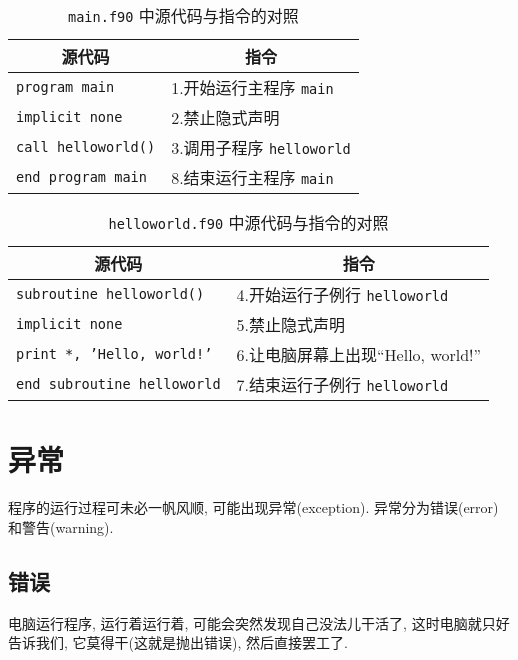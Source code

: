 \begin{table}[!htbp]
    \centering
    \begin{tabular}{|p{}|p{}|}
        \hline
        \multicolumn{1}{|c|}{源代码}&\multicolumn{1}{|c|}{指令}\\
        \hline
        \texttt{program main}&1.开始运行主程序 \texttt{main}\\
        \hline
        \texttt{implicit none}&2.禁止隐式声明\\
        \hline
        \texttt{call helloworld()}&3.调用子程序 \texttt{helloworld}\\
        \hline
        \texttt{end program main}&8.结束运行主程序 \texttt{main}\\
        \hline
    \end{tabular}
    \caption{\texttt{main.f90} 中源代码与指令的对照}
\end{table}
\begin{table}[!htbp]
    \centering
    \begin{tabular}{|p{}|p{}|}
        \hline
        \multicolumn{1}{|c|}{源代码}&\multicolumn{1}{|c|}{指令}\\
        \hline
        \texttt{subroutine helloworld()}&4.开始运行子例行 \texttt{helloworld}\\
        \hline
        \texttt{implicit none}&5.禁止隐式声明\\
        \hline
        \texttt{print *, 'Hello, world!'}&6.让电脑屏幕上出现``Hello, world!''\\
        \hline
        \texttt{end subroutine helloworld}&7.结束运行子例行 \texttt{helloworld}\\
        \hline
    \end{tabular}
    \caption{\texttt{helloworld.f90} 中源代码与指令的对照}
\end{table}

\section{异常}\label{fortran_exception}

程序的运行过程可未必一帆风顺, 可能出现异常(exception). 异常分为错误(error)和警告(warning).

\subsection{错误}\label{fortran_error}

电脑运行程序, 运行着运行着, 可能会突然发现自己没法儿干活了, 这时电脑就只好告诉我们, 它莫得干(这就是抛出错误), 然后直接罢工了.

